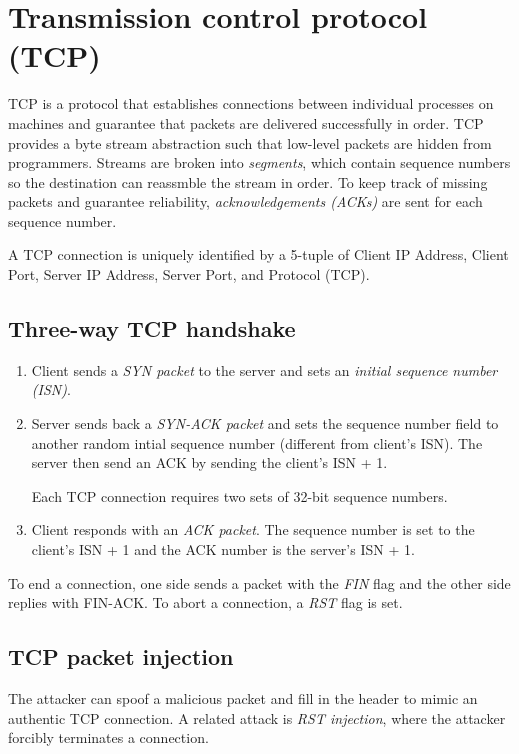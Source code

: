 \section{Transmission control protocol (TCP)}
TCP is a protocol that establishes connections between individual processes on machines and guarantee that packets are delivered successfully in order. TCP provides a byte stream abstraction such that low-level packets are hidden from programmers. Streams are broken into \emph{segments}, which contain sequence numbers so the destination can reassmble the stream in order. To keep track of missing packets and guarantee reliability, \emph{acknowledgements (ACKs)} are sent for each sequence number.

\medskip
A TCP connection is uniquely identified by a 5-tuple of Client IP Address, Client Port, Server IP Address, Server Port, and Protocol (TCP).

\subsection{Three-way TCP handshake}
\begin{enumerate}
    \item Client sends a \emph{SYN packet} to the server and sets an \emph{initial sequence number (ISN)}.
    \item Server sends back a \emph{SYN-ACK packet} and sets the sequence number field to another random intial sequence number (different from client's ISN). The server then send an ACK by sending the client's ISN + 1.
    
    Each TCP connection requires two sets of 32-bit sequence numbers.
    
    \item Client responds with an \emph{ACK packet}. The sequence number is set to the client's ISN + 1 and the ACK number is the server's ISN + 1.
\end{enumerate}

To end a connection, one side sends a packet with the \emph{FIN} flag and the other side replies with FIN-ACK. To abort a connection, a \emph{RST} flag is set.

\subsection{TCP packet injection}
The attacker can spoof a malicious packet and fill in the header to mimic an authentic TCP connection. A related attack is \emph{RST injection}, where the attacker forcibly terminates a connection.

